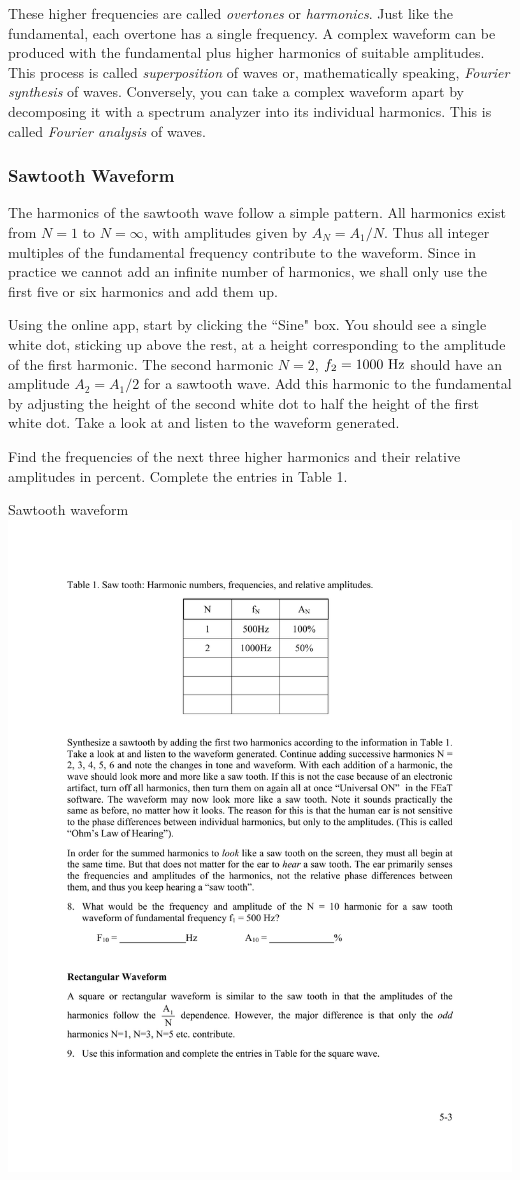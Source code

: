 \documentclass[11pt]{NSF}
\def\i{\item{}}
\begin{document}
These higher frequencies are called {\em overtones} or {\em harmonics}. 
Just like the
fundamental, each overtone has a single frequency. A complex waveform can be
produced with the fundamental plus higher harmonics of suitable amplitudes.
This process is called {\em superposition} of waves or, mathematically speaking,
{\em Fourier synthesis} of waves. Conversely, you can take a complex waveform apart
by decomposing it with a spectrum analyzer into its individual harmonics. This is
called {\em Fourier analysis} of waves.

\subsubsection{Sawtooth Waveform}

The harmonics of the sawtooth wave follow a simple pattern. All harmonics
exist from $N=1$ to $N=\infty$, with amplitudes given by 
$A_N = A_1/N$.
Thus all integer multiples of the fundamental frequency
contribute to the waveform. 
Since in practice we cannot add an infinite number
of harmonics, we shall only use the first five or six harmonics
and add them up.

Using the online app, start by clicking the ``Sine" box.
You should see a single white dot, sticking up above the rest,
at a height corresponding to the amplitude of the first harmonic.
The second harmonic $N=2$, $f_2=1000~{\rm Hz}$ should have an 
amplitude $A_2=A_1/2$ for a sawtooth wave. 
Add this harmonic to the fundamental by adjusting the height 
of the second white dot to half the height of the first white dot. 
Take a look at and listen to the waveform generated.

Find the frequencies of the next three higher harmonics 
and their relative amplitudes in percent. 
Complete the entries in Table 1.
%
\begin{table}[hbtp]
\begin{center}
Sawtooth waveform\\
\includegraphics[width=.35\textwidth]{tab5_1}
\label{t:1}
\end{center}
\end{table}
%
\end{document}
